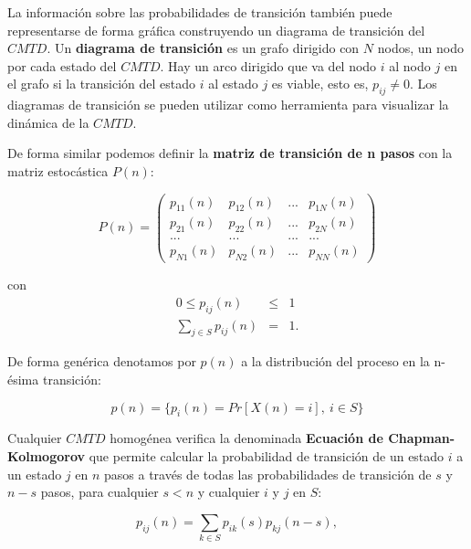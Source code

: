\documentclass[
]{book}
\theoremstyle{definition}
\theoremstyle{definition}
\theoremstyle{definition}
\theoremstyle{definition}
\theoremstyle{remark}
\begin{document}
La información sobre las probabilidades de transición también puede representarse de forma gráfica construyendo un diagrama de transición del \(CMTD\). Un \textbf{diagrama de transición} es un grafo dirigido con \(N\) nodos, un nodo por cada estado del \(CMTD\). Hay un arco dirigido que va del nodo \(i\) al nodo \(j\) en el grafo si la transición del estado \(i\) al estado \(j\) es viable, esto es, \(p_{ij} \neq 0\). Los diagramas de transición se pueden utilizar como herramienta para visualizar la dinámica de la \(CMTD\).

De forma similar podemos definir la \textbf{matriz de transición de n pasos} con la matriz estocástica \(P(n)\):

\[P(n) = 
\begin{pmatrix}
p_{11}(n) & p_{12}(n) & ... & p_{1N}(n)\\
p_{21}(n) & p_{22}(n) & ... & p_{2N}(n)\\
... & ... & ... & ...\\
p_{N1}(n) & p_{N2}(n) & ... & p_{NN}(n)
\end{pmatrix}\]

con \begin{eqnarray*}
0 \leq p_{ij}(n) &\leq& 1 \\
\sum_{j \in S} p_{ij}(n) &=& 1.
\end{eqnarray*}

De forma genérica denotamos por \(p(n)\) a la distribución del proceso en la n-ésima transición:

\[p(n) = \{p_i(n)=Pr[X(n)=i], \ i \in S\}\]

Cualquier \(CMTD\) homogénea verifica la denominada \textbf{Ecuación de Chapman-Kolmogorov} que permite calcular la probabilidad de transición de un estado \(i\) a un estado \(j\) en \(n\) pasos a través de todas las probabilidades de transición de \(s\) y \(n-s\) pasos, para cualquier \(s<n\) y cualquier \(i\) y \(j\) en \(S\):

\begin{equation}
p_{ij}(n) = \sum_{k \in S} p_{ik}(s) p_{kj}(n-s),
\label{eq:ChapmanKol}
\end{equation}
\end{document}
